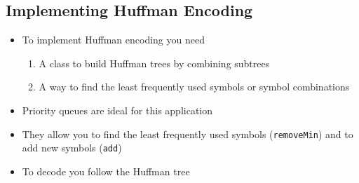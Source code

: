 \begin{slide}
\section{Implementing Huffman Encoding}

\begin{PauseHighLight}
  \begin{itemize}
  \item To implement Huffman encoding you need
    \begin{enumerate}
    \item A class to build Huffman trees by combining subtrees\pause
    \item A way to find the least frequently used symbols or symbol
      combinations\pause
    \end{enumerate}
  \item Priority queues are ideal for this application\pause
  \item They allow you to find the least frequently used symbols
    (\texttt{removeMin}) and to add new symbols (\texttt{add})\pause
  \item To decode you follow the Huffman tree\pause
  \end{itemize}
\end{PauseHighLight}

\end{slide}









